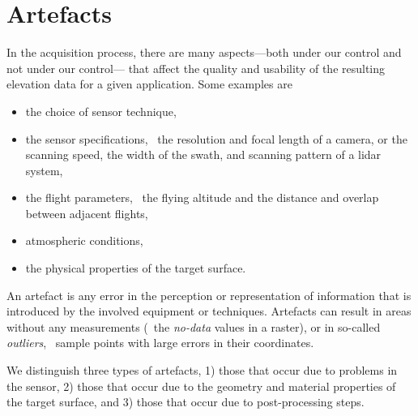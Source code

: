\section{Artefacts}
\label{sec:artefacts}
In the acquisition process, there are many aspects---both under our control and not under our control--- that affect the quality and usability of the resulting elevation data for a given application. 
Some examples are
\begin{itemize}
	\item the choice of sensor technique, 
	\item the sensor specifications, \eg\ the resolution and focal length of a camera, or the scanning speed, the width of the swath, and scanning pattern of a lidar system,
	\item the flight parameters, \eg\ the flying altitude and the distance and overlap between adjacent flights,
	\item atmospheric conditions, 
	\item the physical properties of the target surface.
\end{itemize}

An artefact is any error in the perception or representation of information that is introduced by the involved equipment or techniques. 
Artefacts can result in areas without any measurements (\eg\ the \emph{no-data} values in a raster), or in so-called \emph{outliers}, \ie\ sample points with large errors in their coordinates. 

We distinguish three types of artefacts, 1) those that occur due to problems in the sensor, 2) those that occur due to the geometry and material properties of the target surface, and 3) those that occur due to post-processing steps.


